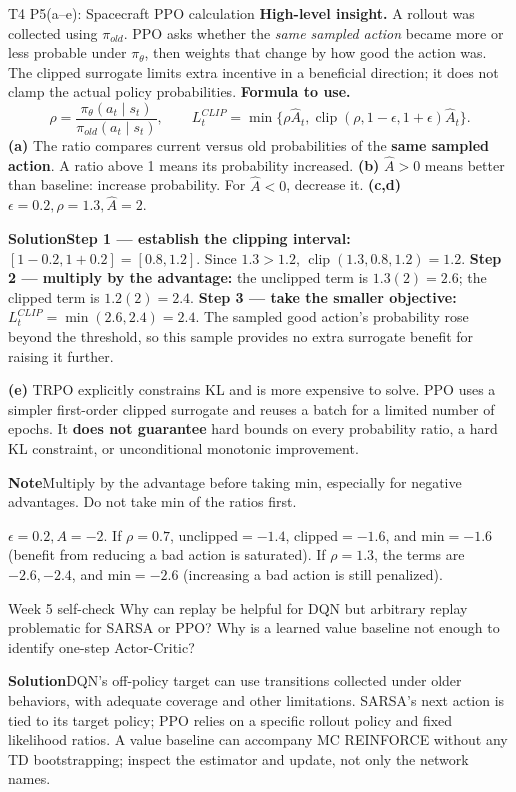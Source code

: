 \documentclass[10pt,a4paper]{article}
\newcommand{\ans}{\par\smallskip\textbf{\color{good}Solution\quad}}
\newcommand{\pit}{\par\smallskip\textbf{\color{warn}Note\quad}}
\begin{document}
\begin{question}{T4 P5(a--e): Spacecraft PPO calculation}\label{q:t4p5}
\textbf{High-level insight.} A rollout was collected using $\pi_{old}$. PPO asks whether the \emph{same sampled action} became more or less probable under $\pi_\theta$, then weights that change by how good the action was. The clipped surrogate limits extra incentive in a beneficial direction; it does not clamp the actual policy probabilities.
\textbf{Formula to use.}
\[
\rho=\frac{\pi_\theta(a_t\mid s_t)}{\pi_{old}(a_t\mid s_t)},\qquad
L_t^{CLIP}=\min\{\rho\widehat A_t,\operatorname{clip}(\rho,1-\epsilon,1+\epsilon)\widehat A_t\}.
\]
\textbf{(a)} The ratio compares current versus old probabilities of the \textbf{same sampled action}. A ratio above 1 means its probability increased.
\textbf{(b)} $\widehat A>0$ means better than baseline: increase probability. For $\widehat A<0$, decrease it.
\textbf{(c,d)} $\epsilon=0.2,\rho=1.3,\widehat A=2$.
\ans \textbf{Step 1 --- establish the clipping interval:} $[1-0.2,1+0.2]=[0.8,1.2]$. Since $1.3>1.2$, $\operatorname{clip}(1.3,0.8,1.2)=1.2$.
\textbf{Step 2 --- multiply by the advantage:} the unclipped term is $1.3(2)=2.6$; the clipped term is $1.2(2)=2.4$.
\textbf{Step 3 --- take the smaller objective:} $\boxed{L_t^{CLIP}=\min(2.6,2.4)=2.4}$. The sampled good action's probability rose beyond the threshold, so this sample provides no extra surrogate benefit for raising it further.

\textbf{(e)} TRPO explicitly constrains KL and is more expensive to solve. PPO uses a simpler first-order clipped surrogate and reuses a batch for a limited number of epochs. It \textbf{does not guarantee} hard bounds on every probability ratio, a hard KL constraint, or unconditional monotonic improvement.
\pit Multiply by the advantage before taking min, especially for negative advantages. Do not take min of the ratios first.
\end{question}

\begin{idea}
$\epsilon=0.2,A=-2$. If $\rho=0.7$, unclipped$=-1.4$, clipped$=-1.6$, and min$=-1.6$ (benefit from reducing a bad action is saturated). If $\rho=1.3$, the terms are $-2.6,-2.4$, and min$=-2.6$ (increasing a bad action is still penalized).
\end{idea}

\begin{question}{Week 5 self-check}
Why can replay be helpful for DQN but arbitrary replay problematic for SARSA or PPO? Why is a learned value baseline not enough to identify one-step Actor-Critic?
\ans DQN's off-policy target can use transitions collected under older behaviors, with adequate coverage and other limitations. SARSA's next action is tied to its target policy; PPO relies on a specific rollout policy and fixed likelihood ratios. A value baseline can accompany MC REINFORCE without any TD bootstrapping; inspect the estimator and update, not only the network names.
\end{question}
\end{document}
